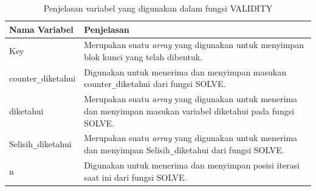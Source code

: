 	 \begin{table}[H]
	 	\caption{Penjelasan variabel yang digunakan dalam fungsi VALIDITY}
		\begin{tabular}   {|p{3cm}|p{6cm}|}\hline
		Nama Variabel&Penjelasan \\ \hline
		Key&Merupakan suatu \textit{array} yang digunakan untuk menyimpan blok kunci yang telah dibentuk. \\ \hline
		counter\verb|_|diketahui&Digunakan untuk menerima dan menyimpan masukan counter\verb|_|diketahui dari fungsi SOLVE.\\ \hline
		diketahui&Merupakan suatu \textit{array} yang digunakan untuk menerima dan menyimpan masukan variabel diketahui pada fungsi SOLVE. \\ \hline
		Selisih\verb|_|diketahui&Merupakan suatu \textit{array} yang digunakan untuk menerima dan menyimpan Selisih\verb|_|diketahui dari fungsi SOLVE. \\ \hline
		n&Digunakan untuk menerima dan menyimpan posisi iterasi saat ini dari fungsi SOLVE. \\ \hline
		\end{tabular}%
		\label{tab:solvar}
	\end{table}